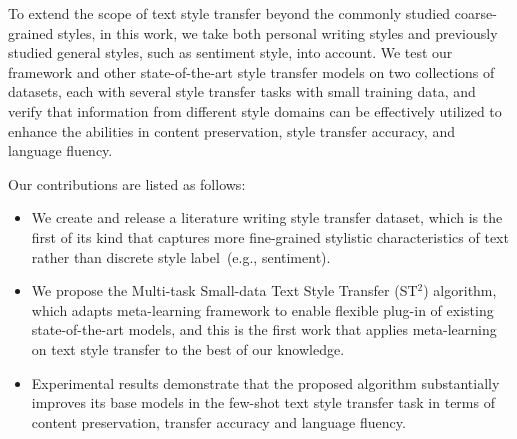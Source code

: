 To extend the scope of text style transfer beyond the commonly studied coarse-grained styles, in this work, we take both personal writing styles and previously studied general styles, such as sentiment style, into account. We test our framework and other state-of-the-art style transfer models on two collections of datasets, each with several style transfer tasks with small training data, and verify that information from different style domains can be effectively utilized to enhance the abilities in content preservation, style transfer accuracy, and language fluency.

Our contributions are listed as follows:
\begin{itemize}
	\item We create and release a literature writing style transfer dataset, which is the first of its kind that captures more fine-grained stylistic characteristics of text rather than discrete style label~(e.g., sentiment).
	\item We propose the Multi-task Small-data Text Style Transfer (ST$^2$) algorithm, which adapts meta-learning framework to enable flexible plug-in of existing state-of-the-art models, and this is the first work that applies meta-learning on text style transfer to the best of our knowledge.
	\item Experimental results demonstrate that the proposed algorithm substantially improves its base models in the few-shot text style transfer task in terms of content preservation, transfer accuracy and language fluency.

\end{itemize}



